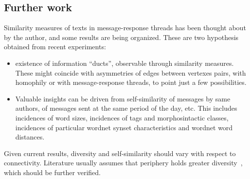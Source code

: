 \documentclass[%
 aip,
 jmp,%
 amsmath,amssymb,
 reprint,%
]{revtex4-1}
\begin{document}
\subsection{Further work}\label{subsec:fw}

Similarity measures of texts in message-response threads has been thought about by the author, and some results are being organized. These are two hypothesis obtained from recent experiments:
\begin{itemize}
    \item existence of information ``ducts'', observable through similarity measures. These might coincide with asymmetries of edges between vertexes pairs, with homophily or with message-response threads, to point just a few possibilities.
    \item Valuable insights can be driven from self-similarity of messages by same authors, of messages sent at the same period of the day, etc. This includes incidences of word sizes, incidences of tags and morphosintactic classes, incidences of particular wordnet synset characteristics and wordnet word distances.
\end{itemize}

Given current results, diversity and self-similarity should vary with respect to connectivity. Literature usually assumes that periphery holds greater diversity~\cite{easley}, which should be further verified.
\end{document}
